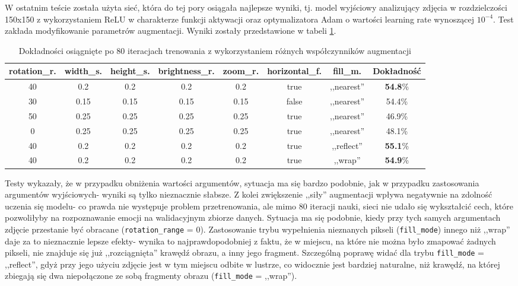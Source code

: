 W ostatnim teście została użyta sieć, która do tej pory osiągała najlepsze wyniki, tj. model wyjściowy analizujący zdjęcia w rozdzielczości 150x150 z wykorzystaniem ReLU w charakterze funkcji aktywacji oraz optymalizatora Adam o wartości learning rate wynoszącej $10^{-4}$. Test zakłada modyfikowanie parametrów augmentacji. Wyniki zostały przedstawione w tabeli \ref{tab:5.9}.

\begin{table}[H]
  \centering
  \caption{Dokładności osiągnięte po 80 iteracjach trenowania z wykorzystaniem różnych współczynników augmentacji}
    \begin{tabular}{ |c|c|c|c|c|c|c|c| }
    \hline
    rotation\_r. & width\_s. & height\_s. & brightness\_r. & zoom\_r. & horizontal\_f. & fill\_m. & Dokładność \\
    \hline
    40 & 0.2 & 0.2 & 0.2 & 0.2 & true & ,,nearest'' & \textbf{54.8}\% \\
    30 & 0.15 & 0.15 & 0.15 & 0.15 & false & ,,nearest'' & 54.4\% \\
    50 & 0.25 & 0.25 & 0.25 & 0.25 & true & ,,nearest'' & 46.9\% \\
    0 & 0.25 & 0.25 & 0.25 & 0.25 & true & ,,nearest'' & 48.1\% \\
    40 & 0.2 & 0.2 & 0.2 & 0.2 & true & ,,reflect'' & \textbf{55.1}\% \\
    40 & 0.2 & 0.2 & 0.2 & 0.2 & true & ,,wrap'' & \textbf{54.9}\% \\
    \hline
    \end{tabular}
  \label{tab:5.9}
\end{table}

Testy wykazały, że w przypadku obniżenia wartości argumentów, sytuacja ma się bardzo podobnie, jak w przypadku zastosowania argumentów wyjściowych- wyniki są tylko nieznacznie słabsze. Z kolei zwiększenie ,,siły'' augmentacji wpływa negatywnie na zdolność uczenia się modelu- co prawda nie występuje problem przetrenowania, ale mimo 80 iteracji nauki, sieci nie udało się wykształcić cech, które pozwoliłyby na rozpoznawanie emocji na walidacyjnym zbiorze danych. Sytuacja ma się podobnie, kiedy przy tych samych argumentach zdjęcie przestanie być obracane (\verb|rotation_range| = 0). Zastosowanie trybu wypełnienia nieznanych pikseli (\verb|fill_mode|) innego niż ,,wrap'' daje za to nieznacznie lepsze efekty- wynika to najprawdopodobniej z faktu, że w miejscu, na które nie można było zmapować żadnych pikseli, nie znajduje się już ,,rozciągnięta'' krawędź obrazu, a inny jego fragment. Szczególną poprawę widać dla trybu \verb|fill_mode| = ,,reflect'', gdyż przy jego użyciu zdjęcie jest w tym miejscu odbite w lustrze, co widocznie jest bardziej naturalne, niż krawędź, na której zbiegają się dwa niepołączone ze sobą fragmenty obrazu (\verb|fill_mode| = ,,wrap'').

